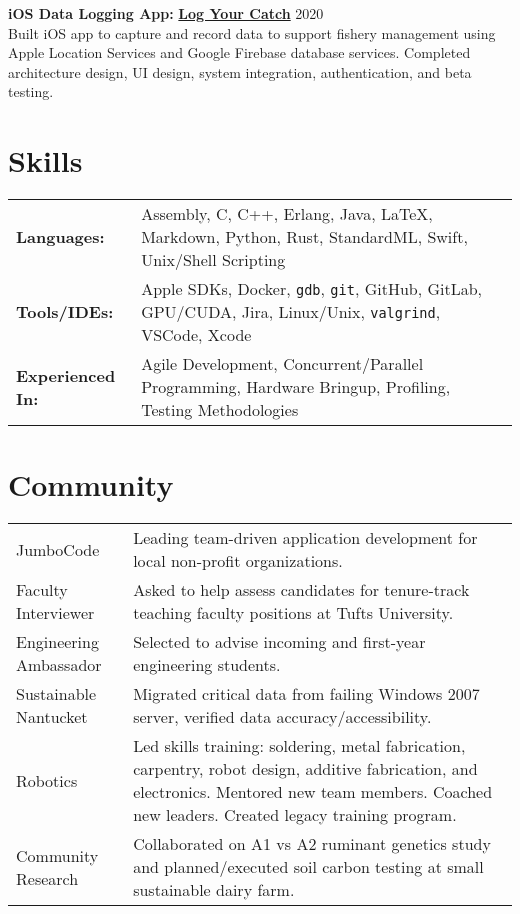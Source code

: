 \documentclass[letter,10pt]{article}
\begin{document}
\begin{minipage}[t]{\linewidth}
    \textbf{iOS Data Logging App:} \href{https://github.com/bstrand42/Log-Your-Catch}{\textbf{Log Your Catch}} \hfill 2020 \\
    Built iOS app to capture and record data to support fishery management using Apple Location Services and Google Firebase database services. Completed architecture design, UI design, system integration, authentication, and beta testing.
\end{minipage}

\section{Skills}
\begin{tabularx}{\linewidth}{@{}l X@{}}
    \textbf{Languages:} & Assembly, C, C++, Erlang, Java, \LaTeX, Markdown, Python, Rust, StandardML, Swift, Unix/Shell Scripting \\
    \textbf{Tools/IDEs:} & Apple SDKs, Docker, \texttt{gdb}, \texttt{git}, GitHub, GitLab, GPU/CUDA, Jira, Linux/Unix, \texttt{valgrind}, VSCode, Xcode \\
    \textbf{Experienced In:} & Agile Development, Concurrent/Parallel Programming, Hardware Bringup, Profiling, Testing Methodologies
\end{tabularx}

\section{Community}
\begin{tabularx}{\linewidth}{@{}l X@{}}	
    JumboCode & Leading team-driven application development for local non-profit organizations. \\[2.75pt]
    Faculty Interviewer & Asked to help assess candidates for tenure-track teaching faculty positions at Tufts University. \\[2.75pt]
    Engineering Ambassador & Selected to advise incoming and first-year engineering students. \\[2.75pt]
    Sustainable Nantucket & Migrated critical data from failing Windows 2007 server, verified data accuracy/accessibility. \\[2.75pt]
    Robotics & Led skills training: soldering, metal fabrication, carpentry, robot design, additive fabrication, and \qquad \qquad electronics. Mentored new team members. Coached new leaders. Created legacy training program. \\[2.75pt]
    Community Research & Collaborated on A1 vs A2 ruminant genetics study and planned/executed soil carbon testing at small sustainable dairy farm.
\end{tabularx}
\end{document}
